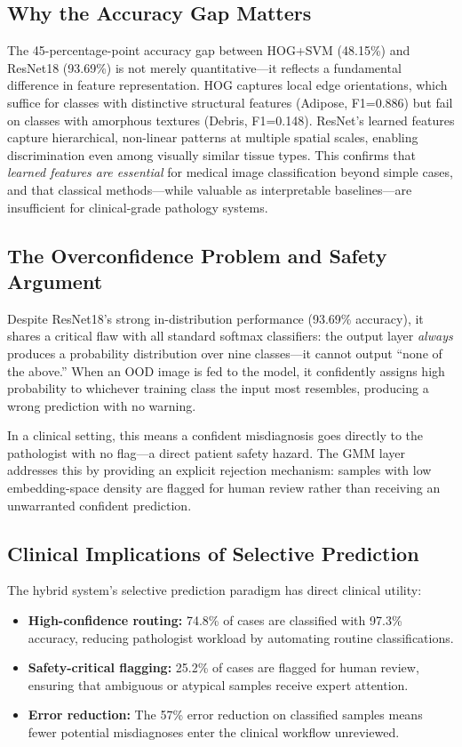 \documentclass{article}
\begin{document}
\subsection{Why the Accuracy Gap Matters}

The 45-percentage-point accuracy gap between HOG+SVM (48.15\%) and ResNet18 (93.69\%) is not merely quantitative---it reflects a fundamental difference in feature representation. HOG captures local edge orientations, which suffice for classes with distinctive structural features (Adipose, F1=0.886) but fail on classes with amorphous textures (Debris, F1=0.148). ResNet's learned features capture hierarchical, non-linear patterns at multiple spatial scales, enabling discrimination even among visually similar tissue types. This confirms that \emph{learned features are essential} for medical image classification beyond simple cases, and that classical methods---while valuable as interpretable baselines---are insufficient for clinical-grade pathology systems.

\subsection{The Overconfidence Problem and Safety Argument}

Despite ResNet18's strong in-distribution performance (93.69\% accuracy), it shares a critical flaw with all standard softmax classifiers: the output layer \emph{always} produces a probability distribution over nine classes---it cannot output ``none of the above.'' When an OOD image is fed to the model, it confidently assigns high probability to whichever training class the input most resembles, producing a wrong prediction with no warning.

In a clinical setting, this means a confident misdiagnosis goes directly to the pathologist with no flag---a direct patient safety hazard. The GMM layer addresses this by providing an explicit rejection mechanism: samples with low embedding-space density are flagged for human review rather than receiving an unwarranted confident prediction.

\subsection{Clinical Implications of Selective Prediction}

The hybrid system's selective prediction paradigm has direct clinical utility:

\begin{itemize}
    \item \textbf{High-confidence routing:} 74.8\% of cases are classified with 97.3\% accuracy, reducing pathologist workload by automating routine classifications.
    \item \textbf{Safety-critical flagging:} 25.2\% of cases are flagged for human review, ensuring that ambiguous or atypical samples receive expert attention.
    \item \textbf{Error reduction:} The 57\% error reduction on classified samples means fewer potential misdiagnoses enter the clinical workflow unreviewed.
\end{itemize}
\end{document}
